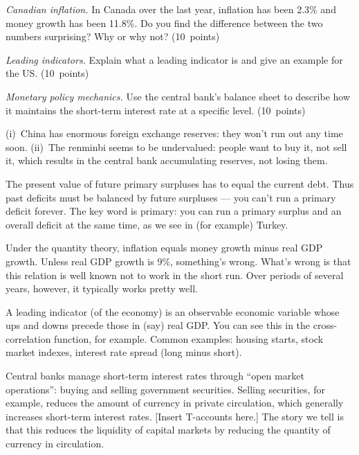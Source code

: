 \documentclass[letterpaper,12pt]{exam}
\begin{document}
\begin{questions}
\begin{parts}
\item {\it Canadian inflation.\/}
In Canada over the last year, inflation has been 2.3\%
and money growth  has been 11.8\%.
Do you find the difference between the two numbers surprising?
Why or why not?  (10~points)

\item {\it Leading indicators.\/}
Explain what a leading indicator is
and give an example for the US.  (10~points)

\item {\it Monetary policy mechanics.\/}
Use the central bank's balance sheet to describe
how it
maintains the short-term interest rate at a specific level.
(10~points)
\end{parts}

\begin{solution}
\begin{parts}
\item (i)~China has enormous foreign exchange
reserves:  they won't run out any time soon.
(ii)~The renminbi seems to be undervalued:
people want to buy it,
not sell it, which results in the central bank accumulating reserves,
not losing them.

\item The present value of future primary surpluses has to equal
the current debt.  Thus past deficits must be balanced by future
surpluses --- you can't run a primary deficit forever. The key word
is primary:  you can run a primary surplus and an overall deficit at
the same time, as we see in (for example) Turkey.

\item Under the quantity theory, inflation equals money growth
minus real GDP growth. Unless real GDP growth is 9\%, something's
wrong. What's wrong is that this relation is well known not to work
in the short run.  Over periods of several years, however, it
typically works pretty well.

\item A leading indicator (of the economy)
is an observable economic variable whose ups and
downs precede those in (say) real GDP.
You can see this in the cross-correlation function, for example.
Common examples:  housing starts, stock market indexes,
interest rate spread (long minus short).

\item Central banks manage short-term interest rates through
``open market operations'': buying and selling government
securities. Selling securities, for example, reduces the amount of
currency in private circulation, which generally increases
short-term interest rates.  [Insert T-accounts here.] The story we
tell is that this reduces the liquidity of capital markets by
reducing the quantity of currency in circulation.

\end{parts}
\end{solution}

\end{questions}
\end{document}

